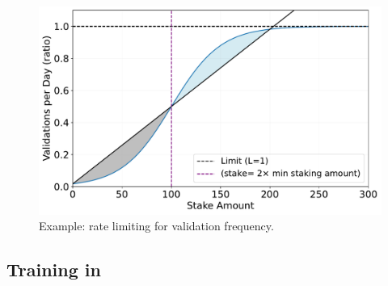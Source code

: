 \documentclass[conference]{IEEEtran}
\begin{document}
\begin{figure}[t]
\centering
\includegraphics[width=\columnwidth]{figures/test_rate_limiting.pdf}
\caption{Example: rate limiting for validation frequency.}
\label{fig:test_rate_limiting}
\end{figure}

\subsection{Training in \SNT}

\end{document}
